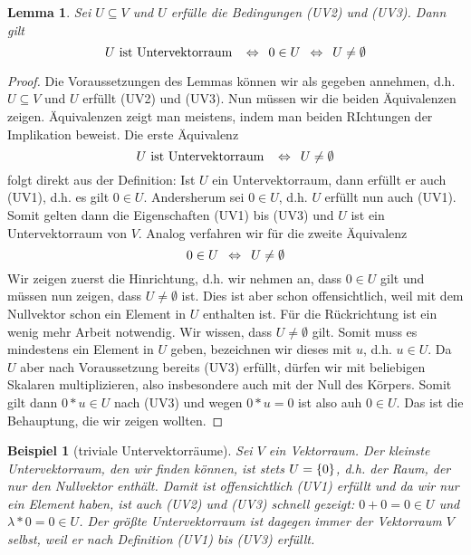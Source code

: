 \documentclass[ngerman, a4paper, 12pt]{scrreprt}
\newcounter{themcount}
\theoremstyle{plain}
\newtheorem{lemma}[themcount]{Lemma}
\newtheorem{beispiel}[themcount]{Beispiel}
\theoremstyle{proofstyle}
\newtheorem{proof}{Beweis}
\begin{document}
	\begin{lemma}
		Sei $U \subseteq V$ und $U$ erfülle die Bedingungen (UV2) und (UV3). Dann gilt 
		\begin{equation*}
			U \text{ ist Untervektorraum } \enskip \Leftrightarrow \enskip 0 \in U  \enskip \Leftrightarrow \enskip U \neq \emptyset
		\end{equation*}
	\end{lemma}
	\begin{proof}
		Die Voraussetzungen des Lemmas können wir als gegeben annehmen, d.h. $U \subseteq V$ und $U$ erfüllt (UV2) und (UV3). Nun müssen wir die beiden Äquivalenzen zeigen. Äquivalenzen zeigt man meistens, indem man beiden RIchtungen der Implikation beweist. Die erste Äquivalenz
		\begin{equation*}
			U \text{ ist Untervektorraum } \enskip \Leftrightarrow \enskip U \neq \emptyset
		\end{equation*}
		folgt direkt aus der Definition: Ist $U$ ein Untervektorraum, dann erfüllt er auch (UV1), d.h. es gilt $0 \in U$. Andersherum sei $0 \in U$, d.h. $U$ erfüllt nun auch (UV1). Somit gelten dann die Eigenschaften (UV1) bis (UV3) und $U$ ist ein Untervektorraum von $V$. Analog verfahren wir für die zweite Äquivalenz
		\begin{equation*}
			0 \in U  \enskip \Leftrightarrow \enskip U \neq \emptyset
		\end{equation*}
		Wir zeigen zuerst die Hinrichtung, d.h. wir nehmen an, dass $0 \in U$ gilt und müssen nun zeigen, dass $U \neq \emptyset$ ist. Dies ist aber schon offensichtlich, weil mit dem Nullvektor schon ein Element in $U$ enthalten ist. Für die Rückrichtung ist ein wenig mehr Arbeit notwendig. Wir wissen, dass $U \neq \emptyset$ gilt. Somit muss es mindestens ein Element in $U$ geben, bezeichnen wir dieses mit $u$, d.h. $u \in U$. Da $U$ aber nach Voraussetzung bereits (UV3) erfüllt, dürfen wir mit beliebigen Skalaren multiplizieren, also insbesondere auch mit der Null des Körpers. Somit gilt dann $0 * u \in U$ nach (UV3) und wegen $0 * u = 0$ ist also auh $0 \in U$. Das ist die Behauptung, die wir zeigen wollten.
	\end{proof}

	\begin{beispiel}[triviale Untervektorräume]
		Sei $V$ ein Vektorraum. Der kleinste Untervektorraum, den wir finden können, ist stets $U = \left\{ 0 \right\}$, d.h. der Raum, der nur den Nullvektor enthält. Damit ist offensichtlich (UV1) erfüllt und da wir nur ein Element haben, ist auch (UV2) und (UV3) schnell gezeigt: $0 + 0 = 0 \in U$ und $\lambda * 0 = 0 \in U$.
		Der größte Untervektorraum ist dagegen immer der Vektorraum $V$ selbst, weil er nach Definition (UV1) bis (UV3) erfüllt.
	\end{beispiel}
\end{document}
